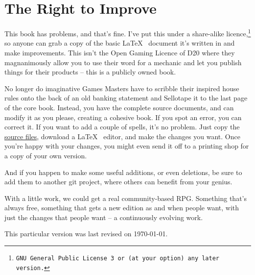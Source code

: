 \section*{The Right to Improve}

\begin{multicols}{2}
\noindent
This book has problems, and that's fine.
I've put this under a share-alike licence,\footnote{\tt GNU General Public License 3 or (at your option) any later version.} so anyone can grab a copy of the basic \LaTeX~ document it's written in and make improvements.
This isn't the Open Gaming Licence of D20 where they magnanimously allow you to use their word for a mechanic and let you publish things for their products -- this is a publicly owned book.

No longer do imaginative Games Masters have to scribble their inspired house rules onto the back of an old banking statement and Sellotape it to the last page of the core book.
Instead, you have the complete source documents, and can modify it as you please, creating a cohesive book.
If you spot an error, you can correct it.
If you want to add a couple of spells, it's no problem.
Just copy the \href{https://gitlab.com/bindrpg/core}{source files}, download a \LaTeX~ editor, and make the changes you want.
Once you're happy with your changes, you might even send it off to a printing shop for a copy of your own version.

And if you happen to make some useful additions, or even deletions, be sure to add them to another git project, where others can benefit from your genius.

With a little work, we could get a real community-based RPG.
Something that's always free, something that gets a new edition as and when people want, with just the changes that people want -- a continuously evolving work.

This particular version was last revised on \today.

\end{multicols}
